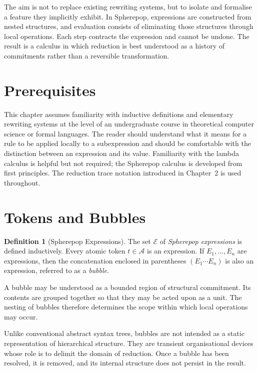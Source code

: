 \documentclass[12pt, oneside]{amsbook}
\theoremstyle{plain}
\theoremstyle{definition}
\newtheorem{definition}[theorem]{Definition}
\theoremstyle{remark}
\newcommand{\Expr}{\mathcal{E}}
\begin{document}
The aim is not to replace existing rewriting systems, but to isolate and
formalise a feature they implicitly exhibit. In Spherepop, expressions are
constructed from nested structures, and evaluation consists of eliminating those
structures through local operations. Each step contracts the expression and
cannot be undone. The result is a calculus in which reduction is best understood
as a history of commitments rather than a reversible transformation.

\section{Prerequisites}

This chapter assumes familiarity with inductive definitions and elementary rewriting systems at the level of an undergraduate course in theoretical computer science or formal languages. The reader should understand what it means for a rule to be applied locally to a subexpression and should be comfortable with the distinction between an expression and its value. Familiarity with the lambda calculus is helpful but not required; the Spherepop calculus is developed from first principles. The reduction trace notation introduced in Chapter~2 is used throughout.

\section{Tokens and Bubbles}
\label{sec:sp:tokens}

\begin{definition}[Spherepop Expressions]
\label{def:sp-expr}
The set $\Expr$ of \emph{Spherepop expressions} is defined inductively. Every
atomic token $t \in \mathcal{A}$ is an expression. If $E_1, \ldots, E_n$ are
expressions, then the concatenation enclosed in parentheses
$(E_1 \cdots E_n)$ is also an expression, referred to as a \emph{bubble}.
\end{definition}

A bubble may be understood as a bounded region of structural commitment. Its
contents are grouped together so that they may be acted upon as a unit. The
nesting of bubbles therefore determines the scope within which local operations
may occur.

Unlike conventional abstract syntax trees, bubbles are not intended as a static
representation of hierarchical structure. They are transient organisational
devices whose role is to delimit the domain of reduction. Once a bubble has been
resolved, it is removed, and its internal structure does not persist in the
result.
\end{document}
